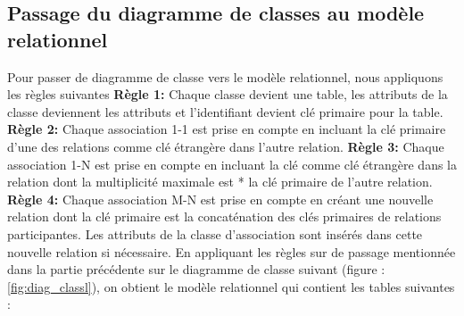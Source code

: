 \documentclass[edit,12pt,a4paper,ChapStyle,oneside,doubleinterligne]{report}
\begin{document}
\subsection{Passage du diagramme de classes au modèle relationnel }
Pour passer de diagramme de classe vers le modèle relationnel, nous appliquons les règles suivantes
\newline
\textbf{Règle 1: }Chaque classe devient une table, les attributs de la classe deviennent
les attributs et l’identifiant devient clé primaire pour la table.
\newline
\textbf{Règle 2: }Chaque association 1-1 est prise en compte en incluant la clé primaire
d’une des relations comme clé étrangère dans l’autre relation.
\newline
\textbf{Règle 3: }Chaque association 1-N est prise en compte en incluant la clé comme
clé étrangère dans la relation dont la multiplicité maximale est * la clé primaire
de l’autre relation.
\newline
\textbf{Règle 4: }Chaque association M-N est prise en compte en créant une nouvelle
relation dont la clé primaire est la concaténation des clés primaires de relations
participantes. Les attributs de la classe d’association sont insérés dans cette nouvelle relation si nécessaire.
\newline \phantom{hassane} \newline
En appliquant les règles sur de passage mentionnée dans la partie précédente sur le diagramme de classe suivant (figure : \ref{fig:diag_classl}), on obtient le modèle relationnel qui contient les tables suivantes :
\end{document}
